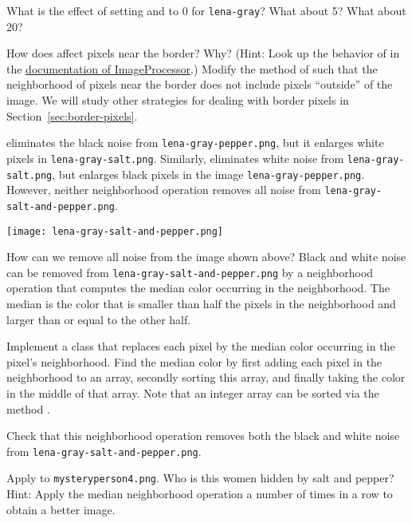 \documentclass{book}
\begin{document}
\begin{exercise}
What is the effect of setting  and  to 0 for \texttt{lena-gray}? What about 5? What about 20?
\end{exercise}

\begin{exercise}
How does  affect pixels near the border? Why? (Hint: Look up the behavior of  in the \href{http://rsb.info.nih.gov/ij/developer/api/ij/process/ImageProcessor.html\#getPixel(int,\%20int)}{documentation of ImageProcessor}.) Modify the method  of  such that the neighborhood of pixels near the border does not include pixels ``outside'' of the image. We will study other strategies for dealing with border pixels in Section~\ref{sec:border-pixels}.
\end{exercise}

 eliminates the black noise from \texttt{lena-gray-pepper.png}, but it enlarges white pixels in \texttt{lena-gray-salt.png}. Similarly,  eliminates white noise from \texttt{lena-gray-salt.png}, but enlarges black pixels in the image \texttt{lena-gray-pepper.png}. However, neither neighborhood operation removes all noise from \texttt{lena-gray-salt-and-pepper.png}. 
\begin{center}
\texttt{[image: lena-gray-salt-and-pepper.png]}
\end{center}
How can we remove all noise from the image shown above? Black and white noise can be removed from \texttt{lena-gray-salt-and-pepper.png} by a neighborhood operation that computes the median color occurring in the neighborhood. The median is the color that is smaller than half the pixels in the neighborhood and larger than or equal to the other half. 

\begin{exercise}
Implement a class  that replaces each pixel by the median color occurring in the pixel's neighborhood. Find the median color by first adding each pixel in the neighborhood to an array, secondly sorting this array, and finally taking the color in the middle of that array. Note that an integer array can be sorted via the method .

Check that this neighborhood operation removes both the black and white noise from \texttt{lena-gray-salt-and-pepper.png}.
\end{exercise}

\begin{exercise}
Apply  to \texttt{mysteryperson4.png}. Who is this women hidden by salt and pepper? Hint: Apply the median neighborhood operation a number of times in a row to obtain a better image.
\end{exercise}
\end{document}

